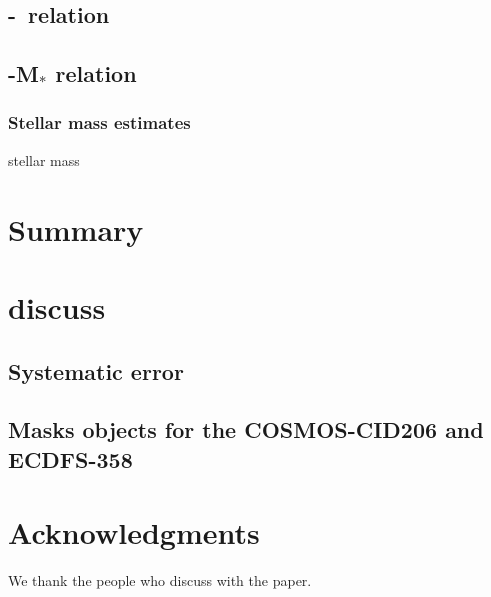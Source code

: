 \documentclass[apj]{emulateapj}
\begin{document}
\subsection{\mbh-\lhost\ relation}

\subsection{\mbh-M$_*$ relation}
\subsubsection{Stellar mass estimates}
stellar mass \\

\section{Summary}
\label{sec:sum}

\section{discuss}
\label{sec:dis}
\subsection{Systematic error}
\subsection{Masks objects for the COSMOS-CID206 and ECDFS-358}

\section*{Acknowledgments}
We thank the people who discuss with the paper.



\end{document}
